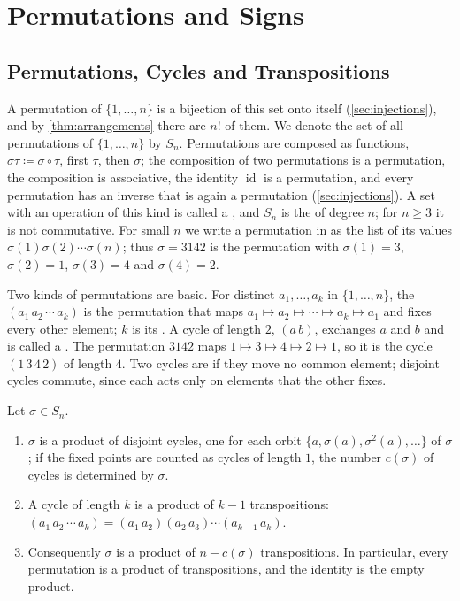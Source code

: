 \section{Permutations and Signs}
\label{sec:permutations-signs}

\subsection{Permutations, Cycles and Transpositions}

A permutation of $\{1,\ldots,n\}$ is a bijection of this set onto itself (\cref{sec:injections}), and by \cref{thm:arrangements} there are $n!$ of them. We denote the set of all permutations of $\{1,\ldots,n\}$ by $S_n$. Permutations are composed as functions, $\sigma\tau\coloneqq\sigma\circ\tau$, first $\tau$, then $\sigma$; the composition of two permutations is a permutation, the composition is associative, the identity $\operatorname{id}$ is a permutation, and every permutation has an inverse that is again a permutation (\cref{sec:injections}). A set with an operation of this kind is called a , and $S_n$ is the  of degree $n$; for $n\ge3$ it is not commutative. For small $n$ we write a permutation in  as the list of its values $\sigma(1)\sigma(2)\cdots\sigma(n)$; thus $\sigma=3142$ is the permutation with $\sigma(1)=3$, $\sigma(2)=1$, $\sigma(3)=4$ and $\sigma(4)=2$.

Two kinds of permutations are basic. For distinct $a_1,\ldots,a_k$ in $\{1,\ldots,n\}$, the  $(a_1\,a_2\,\cdots\,a_k)$ is the permutation that maps $a_1\mapsto a_2\mapsto\cdots\mapsto a_k\mapsto a_1$ and fixes every other element; $k$ is its . A cycle of length $2$, $(a\,b)$, exchanges $a$ and $b$ and is called a . The permutation $3142$ maps $1\mapsto3\mapsto4\mapsto2\mapsto1$, so it is the cycle $(1\,3\,4\,2)$ of length $4$. Two cycles are  if they move no common element; disjoint cycles commute, since each acts only on elements that the other fixes.

\begin{proposition}
\label{prop:cycles}
Let $\sigma\in S_n$.
\begin{enumerate}
\item $\sigma$ is a product of disjoint cycles, one for each orbit $\{a,\sigma(a),\sigma^2(a),\ldots\}$ of $\sigma$; if the fixed points are counted as cycles of length $1$, the number $c(\sigma)$ of cycles is determined by $\sigma$.
\item A cycle of length $k$ is a product of $k-1$ transpositions: $(a_1\,a_2\,\cdots\,a_k)=(a_1\,a_2)(a_2\,a_3)\cdots(a_{k-1}\,a_k)$.
\item Consequently $\sigma$ is a product of $n-c(\sigma)$ transpositions. In particular, every permutation is a product of transpositions, and the identity is the empty product.
\end{enumerate}
\end{proposition}

